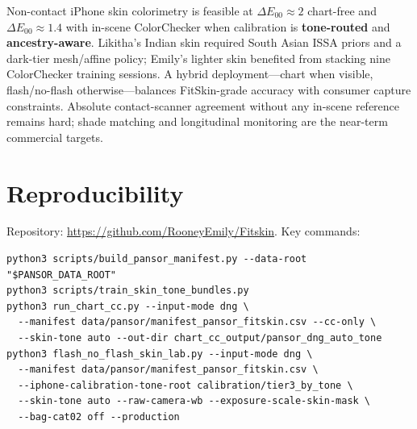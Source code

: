 \documentclass[11pt]{article}
\newcommand{\deee}{\ensuremath{\Delta E_{00}}}
\begin{document}
Non-contact iPhone skin colorimetry is feasible at $\deee\approx 2$ chart-free and $\deee\approx 1.4$ with in-scene ColorChecker when calibration is \textbf{tone-routed} and \textbf{ancestry-aware}.
Likitha's Indian skin required South Asian ISSA priors and a dark-tier mesh/affine policy; Emily's lighter skin benefited from stacking nine ColorChecker training sessions.
A hybrid deployment---chart when visible, flash/no-flash otherwise---balances FitSkin-grade accuracy with consumer capture constraints.
Absolute contact-scanner agreement without any in-scene reference remains hard; shade matching and longitudinal monitoring are the near-term commercial targets.

\section*{Reproducibility}

\noindent
Repository: \url{https://github.com/RooneyEmily/Fitskin}.
Key commands:
\begin{verbatim}
python3 scripts/build_pansor_manifest.py --data-root "$PANSOR_DATA_ROOT"
python3 scripts/train_skin_tone_bundles.py
python3 run_chart_cc.py --input-mode dng \
  --manifest data/pansor/manifest_pansor_fitskin.csv --cc-only \
  --skin-tone auto --out-dir chart_cc_output/pansor_dng_auto_tone
python3 flash_no_flash_skin_lab.py --input-mode dng \
  --manifest data/pansor/manifest_pansor_fitskin.csv \
  --iphone-calibration-tone-root calibration/tier3_by_tone \
  --skin-tone auto --raw-camera-wb --exposure-scale-skin-mask \
  --bag-cat02 off --production
\end{verbatim}



\end{document}
